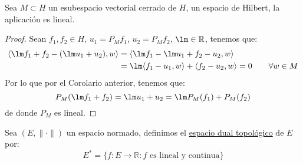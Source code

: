 \begin{prop}
    Sea $M\subset H$ un esubespacio vectorial cerrado de $H$, un espacio de Hilbert, la aplicación
    es lineal.
    \begin{proof}
        Sean $f_1,f_2\in H$, $u_1 = P_Mf_1$, $u_2 = P_Mf_2$, $\lm \in \mathbb{R}$, tenemos que:
        \begin{align*}
            \langle \lm f_1+f_2-(\lm u_1+u_2),w \rangle  &= \langle \lm f_1 - \lm u_1 +f_2 - u_2, w \rangle \\ &= \lm \langle f_1 -u_1,w \rangle + \langle f_2-u_2,w \rangle  = 0 \qquad \forall w\in M
        \end{align*}
        Por lo que por el Corolario anterior, tenemos que: 
        \begin{equation*}
            P_M(\lm f_1 + f_2) = \lm u_1 + u_2 = \lm P_M(f_1) + P_M(f_2)
        \end{equation*}
        de donde $P_M$ es lineal.
    \end{proof}
\end{prop}

\begin{definicion}
    Sea $(E,\|\cdot \|)$ un espacio normado, definimos el \underline{espacio dual topológico} de $E$ por:
    \begin{equation*}
        E^\ast = \{f:E\to \mathbb{R} : f \text{\ es lineal y continua}\}
    \end{equation*}
\end{definicion}


